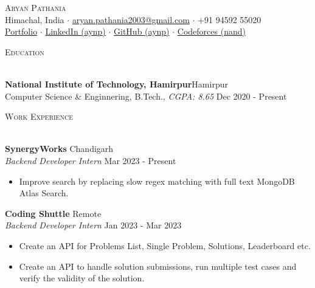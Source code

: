 \documentclass[a4paper]{article}
\newcommand{\lineunder} {
    \vspace*{-8pt} \\
    \hspace*{-18pt} \hrulefill \\
}
\newcommand{\header} [1] {
    {\hspace*{-18pt}\vspace*{6pt} \textsc{#1}}
    \vspace*{-6pt} \lineunder
}
\begin{document}

\begin{center}
	{\Huge \scshape {Aryan Pathania}}\\
	\vspace{0.5mm}
	Himachal, India $\cdot$ \href{mailto: aryan.pathania2003@gmail.com}{aryan.pathania2003@gmail.com} $\cdot$ +91 94592 55020\\
	\vspace{0.5mm}
	\href{https://aryanpathania.vercel.app/}{Portfolio} $\cdot$
	\href{https://linkedin.com/in/aynp/}{LinkedIn (aynp)} $\cdot$
	\href{https://www.github.com/aynp}{GitHub (aynp)} $\cdot$
	\href{https://www.github.com/aynp}{Codeforces (nand)} \\
\end{center}

\vspace{-4mm}

\header{Education}
\vspace{1mm}

\textbf{National Institute of Technology, Hamirpur}\hfill Hamirpur\\
Computer Science \& Enginnering, B.Tech., \textit{CGPA: 8.65} \hfill Dec 2020 - Present\\
\vspace{1.5mm}


\header{Work Experience}
\vspace{1mm}

\textbf{SynergyWorks} \hfill Chandigarh\\
\textit{Backend Developer Intern} \hfill Mar 2023 - Present\\
\begin{itemize}
	\item Improve search by replacing slow regex matching with full text MongoDB Atlas Search.
\end{itemize}
\vspace{1.5mm}


\textbf{Coding Shuttle} \hfill Remote\\
\textit{Backend Developer Intern} \hfill Jan 2023 - Mar 2023\\
\begin{itemize}
  \item Create an API for Problems List, Single Problem, Solutions, Leaderboard etc.
	\item Create an API to handle solution submissions, run multiple test cases and verify the validity of the solution.
\end{itemize}
\vspace{1.5mm}
\end{document}
